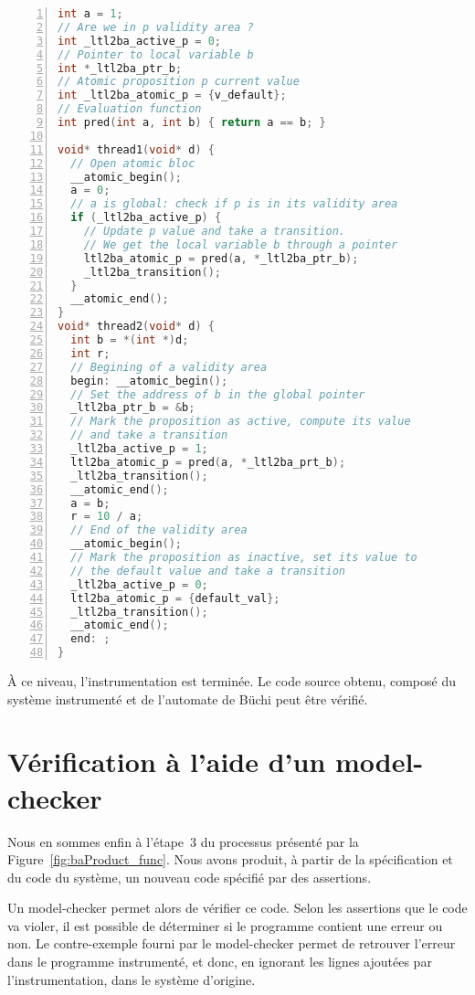 \begin{lstlisting}[language=C, frame=single, numbers=left,
  caption=Instrumentation finale pour des variables locales et globales]
int a = 1;
// Are we in p validity area ?
int _ltl2ba_active_p = 0;
// Pointer to local variable b
int *_ltl2ba_ptr_b;
// Atomic proposition p current value
int _ltl2ba_atomic_p = {v_default};
// Evaluation function
int pred(int a, int b) { return a == b; }

void* thread1(void* d) {
  // Open atomic bloc
  __atomic_begin();
  a = 0;
  // a is global: check if p is in its validity area
  if (_ltl2ba_active_p) {
    // Update p value and take a transition.
    // We get the local variable b through a pointer
    ltl2ba_atomic_p = pred(a, *_ltl2ba_ptr_b);
    _ltl2ba_transition();
  }
  __atomic_end();
}
void* thread2(void* d) {
  int b = *(int *)d;
  int r;
  // Begining of a validity area
  begin: __atomic_begin();
  // Set the address of b in the global pointer
  _ltl2ba_ptr_b = &b;
  // Mark the proposition as active, compute its value
  // and take a transition
  _ltl2ba_active_p = 1;
  ltl2ba_atomic_p = pred(a, *_ltl2ba_prt_b);
  _ltl2ba_transition();
  __atomic_end();
  a = b;
  r = 10 / a;
  // End of the validity area
  __atomic_begin();
  // Mark the proposition as inactive, set its value to
  // the default value and take a transition
  _ltl2ba_active_p = 0;
  ltl2ba_atomic_p = {default_val};
  _ltl2ba_transition();
  __atomic_end();
  end: ;
}
\end{lstlisting}

À ce niveau, l'instrumentation est terminée. Le code source obtenu, composé du
système instrumenté et de l'automate de Büchi peut être vérifié.

\section{Vérification à l'aide d'un model-checker}

Nous en sommes enfin à l'étape~3 du processus présenté par la
Figure~\ref{fig:baProduct_func}. Nous avons produit, à partir de la
spécification et du code du système, un nouveau code spécifié par des
assertions.

Un model-checker permet alors de vérifier ce code. Selon les assertions que le
code va violer, il est possible de déterminer si le programme contient une
erreur ou non. Le contre-exemple fourni par le model-checker permet de
retrouver l'erreur dans le programme instrumenté, et donc, en ignorant les
lignes ajoutées par l'instrumentation, dans le système d'origine.

